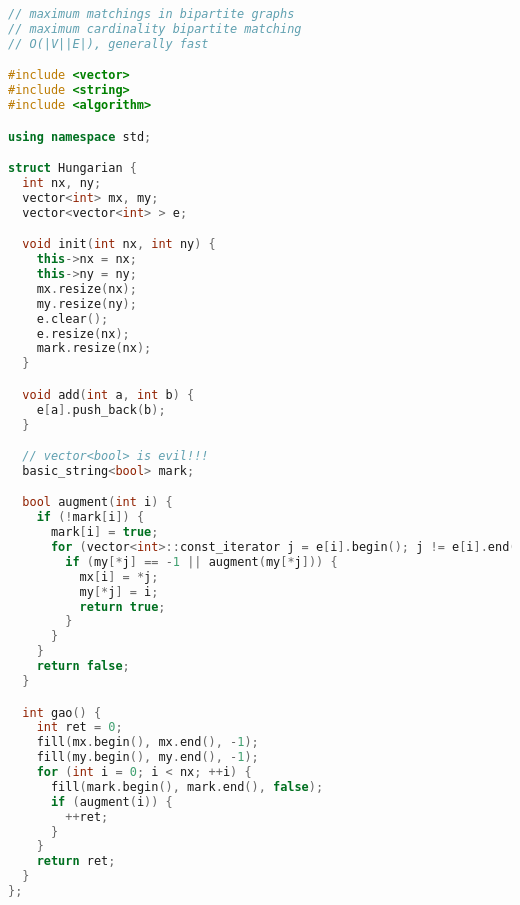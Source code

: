 \begin{lstlisting}[language=C++]
// maximum matchings in bipartite graphs
// maximum cardinality bipartite matching
// O(|V||E|), generally fast

#include <vector>
#include <string>
#include <algorithm>

using namespace std;

struct Hungarian {
  int nx, ny;
  vector<int> mx, my;
  vector<vector<int> > e;

  void init(int nx, int ny) {
    this->nx = nx;
    this->ny = ny;
    mx.resize(nx);
    my.resize(ny);
    e.clear();
    e.resize(nx);
    mark.resize(nx);
  }

  void add(int a, int b) {
    e[a].push_back(b);
  }

  // vector<bool> is evil!!!
  basic_string<bool> mark;

  bool augment(int i) {
    if (!mark[i]) {
      mark[i] = true;
      for (vector<int>::const_iterator j = e[i].begin(); j != e[i].end(); ++j) {
        if (my[*j] == -1 || augment(my[*j])) {
          mx[i] = *j;
          my[*j] = i;
          return true;
        }
      }
    }
    return false;
  }

  int gao() {
    int ret = 0;
    fill(mx.begin(), mx.end(), -1);
    fill(my.begin(), my.end(), -1);
    for (int i = 0; i < nx; ++i) {
      fill(mark.begin(), mark.end(), false);
      if (augment(i)) {
        ++ret;
      }
    }
    return ret;
  }
};


\end{lstlisting}
